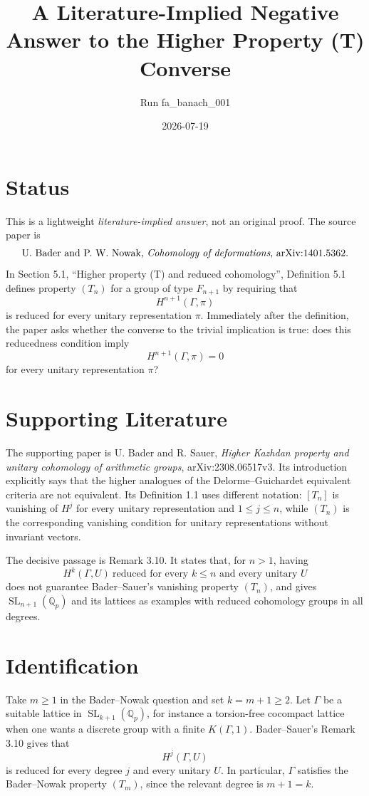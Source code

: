 \documentclass[11pt]{article}
\title{A Literature-Implied Negative Answer to the Higher Property (T) Converse}
\author{Run fa\_banach\_001}
\date{2026-07-19}
\newcommand{\GammaG}{\Gamma}
\newcommand{\SL}{\operatorname{SL}}
\newcommand{\QQ}{\mathbb Q}
\begin{document}
\maketitle

\section{Status}

This is a lightweight \emph{literature-implied answer}, not an original proof.
The source paper is
\[
\text{U. Bader and P. W. Nowak, \emph{Cohomology of deformations},
arXiv:1401.5362.}
\]
In Section 5.1, ``Higher property (T) and reduced cohomology'', Definition 5.1
defines property \((T_n)\) for a group of type \(F_{n+1}\) by requiring that
\[
  H^{n+1}(\GammaG,\pi)
\]
is reduced for every unitary representation \(\pi\).  Immediately after the
definition, the paper asks whether the converse to the trivial implication is
true: does this reducedness condition imply
\[
  H^{n+1}(\GammaG,\pi)=0
\]
for every unitary representation \(\pi\)?

\section{Supporting Literature}

The supporting paper is U. Bader and R. Sauer,
\emph{Higher Kazhdan property and unitary cohomology of arithmetic groups},
arXiv:2308.06517v3.
Its introduction explicitly says that the higher analogues of the
Delorme--Guichardet equivalent criteria are not equivalent.  Its Definition 1.1
uses different notation: \( [T_n]\) is vanishing of \(H^j\) for every unitary
representation and \(1\leq j\leq n\), while \((T_n)\) is the corresponding
vanishing condition for unitary representations without invariant vectors.

The decisive passage is Remark 3.10.  It states that, for \(n>1\), having
\[
  H^k(\GammaG,U)\ \text{reduced for every }k\leq n
  \text{ and every unitary }U
\]
does not guarantee Bader--Sauer's vanishing property \((T_n)\), and gives
\(\SL_{n+1}(\QQ_p)\) and its lattices as examples with reduced cohomology
groups in all degrees.

\section{Identification}

Take \(m\geq 1\) in the Bader--Nowak question and set \(k=m+1\geq 2\).  Let
\(\GammaG\) be a suitable lattice in \(\SL_{k+1}(\QQ_p)\), for instance a
torsion-free cocompact lattice when one wants a discrete group with a finite
\(K(\GammaG,1)\).  Bader--Sauer's Remark 3.10 gives that
\[
  H^j(\GammaG,U)
\]
is reduced for every degree \(j\) and every unitary \(U\).  In particular,
\(\GammaG\) satisfies the Bader--Nowak property \((T_m)\), since the relevant
degree is \(m+1=k\).
\end{document}
